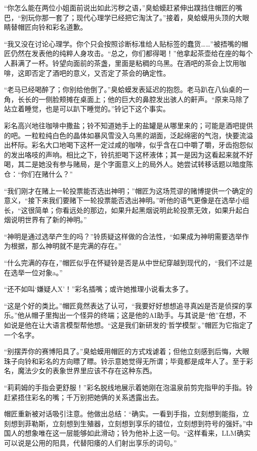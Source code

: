 “你怎么能在两位小姐面前说出如此污秽之语，”臭蛤蟆赶紧伸出蹼挡住帽匠的嘴巴，“别玩你那一套了；现代心理学已经把它淘汰了。”接着，臭蛤蟆用头顶的大眼睛替帽匠向铃和彩名道歉。

“我又没在讨论心理学。你个只会按照诊断标准给人贴标签的蠢货……”被捂嘴的帽匠仍然在发表他的纯粹人身攻击。“总之，你们都得喝！”他拿起茶壶给在座的每个人斟满了一杯。铃望向面前的茶盏，里面是粘稠的乌黑。在酒吧的茶会上饮用咖啡，这即否定了酒吧的意义，又否定了茶会的确定性。

“老马已经喝醉了；你别给他倒了。”臭蛤蟆发表延迟的抱怨。老马趴在八仙桌的一角，长长的一侧脸颊摊在桌面上；他的巨大的鼻腔发出骇人的鼾声。“原来马除了站立着睡觉，也是可以趴下睡觉的。”铃记下这个事实。

彩名高兴地往咖啡中撒盐；铃不知道她手上的盐罐是从哪里来的；可能是酒吧提供的吧。一粒粒纯白色的晶体如暴风雪没入乌黑的湖面，泛起绵密的气泡，快要流溢出杯际。彩名大口地喝下这杯一定过咸的咖啡，似乎含在口中嚼了嚼，牙齿抱怨似的发出咯吱的声响。相比之下，铃抗拒喝下这杯液体；其一是因为这看起来就不好喝，其二是她没有参与赌局，是个字面意义上的局外人。她尝试转移话题以暗度陈仓：“你们在赌什么？”

“我们刚才在赌上一轮投票能否选出神明；”帽匠为这场荒谬的赌博提供一个确定的意义，“接下来我们要赌下一轮投票能否选出神明。”听他的语气更像是在选举小组长，“这很简单；你看远处的那边，如果升起黑烟说明此轮投票无效，如果升起白烟说明世界有了新的神明。”

“神明是通过选举产生的吗？”铃质疑这样做的合法性，“如果成为神明需要选举作为根据，那么神明就不是完满的存在。”

“什么完满的存在，”帽匠似乎在怀疑铃是否是从中世纪穿越到现代的，“我们不过是在选举一位对象a。”

“还不如叫‘嫌疑人X’！”彩名插嘴；或许她推理小说看太多了。

“这是个好的类比。”帽匠竟然表达了认可，“我要好好想想追寻真凶是否是侦探的享乐。”他从帽子里掏出一个怪异的终端；这是他的AI助手。与其说是“他”在想，不如说是他在让大语言模型帮他想。“这是我们新研发的‘哲学模型’。”帽匠为它指定了一个名字。

“别摆弄你的赛博阳具了。”臭蛤蟆用帽匠的方式戏谑着；但他立刻感到后悔，大眼珠子向铃和彩名的方向瞟了瞟。铃示意她觉得无所谓；毕竟都是成年人了。至于彩名，魔法少女的表象世界里应该不存在这种东西。

“莉莉姆的手指会更舒服！”彩名脱线地展示着她刚在泡温泉前剪完指甲的手指。铃赶紧捂住彩名的嘴；千万别把她俩的关系透露出去。

帽匠重新被对话吸引注意。他做出总结：“确实。一看到手指，立刻想到能指，立刻想到菲勒斯，立刻想到生殖器，立刻想到享乐的错位，立刻想到符号的强奸。”中国人的想象唯在这一层能够如此滑动；铃为他补上这一句。“这样看来，LLM确实可以说是公用的阳具，代替阳痿的人们射出享乐的词句。”


